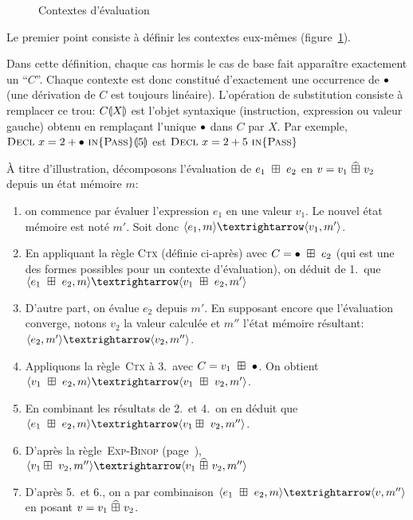 \begin{figure}
\figctx{}

\caption{Contextes d'évaluation}
\label{fig:eval-ctx}
\end{figure}

Le premier point consiste à définir les contextes eux-mêmes
(figure~\ref{fig:eval-ctx}).

Dans cette définition, chaque cas hormis le cas de base fait apparaître
exactement un \enquote{$C$}. Chaque contexte est donc constitué d'exactement une
occurrence de $\bullet$ (une dérivation de $C$ est toujours linéaire).
L'opération de substitution consiste à remplacer ce trou: $C\llparenthesis X\rrparenthesis$ est
l'objet syntaxique (instruction, expression ou valeur gauche) obtenu en
remplaçant l'unique $\bullet$ dans $C$ par $X$. Par exemple,
$\textsc{Decl}~x=2+\bullet~\textsc{in}\{\textsc{Pass}\}\llparenthesis5\rrparenthesis$ est $\textsc{Decl}~x=2+5~\textsc{in}\{\textsc{Pass}\}$

À titre d'illustration, décomposons l'évaluation de $e_1~\boxplus~e_2$ en $v =
v_1~\widehat{\boxplus}~v_2$ depuis un état mémoire $m$:

\begin{enumerate}
\item
  on commence par évaluer l'expression $e_1$ en une valeur $v_1$. Le nouvel
  état mémoire est noté $m'$. Soit donc $\mm{m}{e_1}{m'}{v_1}$.
\item
  En appliquant la règle \textsc{Ctx} (définie ci-après) avec $C =
  \bullet~\boxplus~e_2$ (qui est une des formes possibles pour un contexte
  d'évaluation), on déduit de 1.\ que
  $\mm{m}{e_1~\opbin~e_2}{m'}{v_1~\opbin~e_2}$
\item
  D'autre part, on évalue $e_2$ depuis $m'$. En supposant encore que
  l'évaluation converge, notons $v_2$ la valeur calculée et $m''$ l'état mémoire
  résultant: $\mm{m'}{e_2}{m''}{v_2}$.
\item
  Appliquons la règle~\textsc{Ctx} à 3.\ avec $C = v_1~\boxplus~\bullet$. On
  obtient $\mm{m}{v_1~\opbin~e_2}{m'}{v_1~\opbin~v_2}$.
\item
  En combinant les résultats de 2.\ et 4.\ on en déduit que
  $\mm{m}{e_1~\opbin~e_2}{m''}{v_1\opbin~v_2}$.
\item D'après la règle~\textsc{Exp-Binop}
    (page~\pageref{rule:exp-binop}),
  $ \mm{m''}{v_1\opbin~v_2}{m''}{v_1~\widehat{\opbin}~v_2}$
\item D'après 5.\ et 6., on a par combinaison
  $\mm{m}{e_1~\opbin~e_2}{m''}{v}$
  en posant
  $v = v_1~\widehat{\boxplus}~v_2$.
\end{enumerate}

